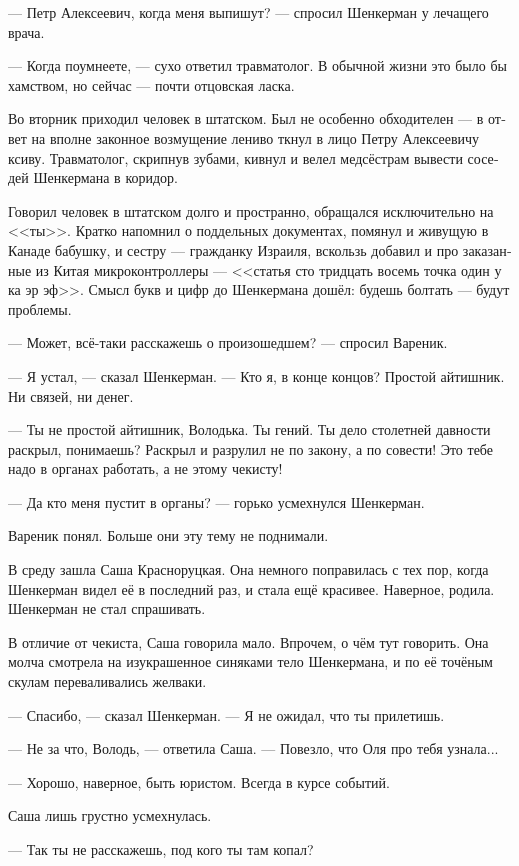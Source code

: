 \documentclass[a5paper,12pt,fleqn]{extbook}\usepackage{cooltooltips}\usepackage{polyglossia}\setdefaultlanguage[babelshorthands=true]{russian}\setotherlanguage{english}\defaultfontfeatures{Ligatures=TeX,Mapping=tex-text} \usepackage{xcolor}\definecolor{lightgray}{HTML}{bbbbbb}\color{lightgray}\newcommand{\ml}[3]{\textenglish{\textcolor{black}{#3}}}
\begin{document}
--- Петр Алексеевич, когда меня выпишут? --- спросил Шенкерман у лечащего врача.

--- Когда поумнеете, --- сухо ответил травматолог.
В обычной жизни это было бы хамством, но сейчас --- почти отцовская ласка.

Во вторник приходил человек в штатском.
Был не особенно обходителен --- в ответ на вполне законное возмущение лениво ткнул в лицо Петру Алексеевичу ксиву.
Травматолог, скрипнув зубами, кивнул и велел медсёстрам вывести соседей Шенкермана в коридор.

Говорил человек в штатском долго и пространно, обращался исключительно на <<ты>>.
Кратко напомнил о поддельных документах, помянул и живущую в Канаде бабушку, и сестру --- гражданку Израиля, вскользь добавил и про заказанные из Китая микроконтроллеры --- <<статья сто тридцать восемь точка один у ка эр эф>>.
Смысл букв и цифр до Шенкермана дошёл: будешь болтать --- будут проблемы.

--- Может, всё-таки расскажешь о произошедшем? --- спросил Вареник.

--- Я устал, --- сказал Шенкерман.
--- Кто я, в конце концов?
Простой айтишник.
Ни связей, ни денег.

--- Ты не простой айтишник, Володька.
Ты гений.
Ты дело столетней давности раскрыл, понимаешь?
Раскрыл и разрулил не по закону, а по совести!
Это тебе надо в органах работать, а не этому чекисту!

--- Да кто меня пустит в органы? --- горько усмехнулся Шенкерман.

Вареник понял.
Больше они эту тему не поднимали.

В среду зашла Саша Красноруцкая.
Она немного поправилась с тех пор, когда Шенкерман видел её в последний раз, и стала ещё красивее.
Наверное, родила.
Шенкерман не стал спрашивать.

В отличие от чекиста, Саша говорила мало.
Впрочем, о чём тут говорить.
Она молча смотрела на изукрашенное синяками тело Шенкермана, и по её точёным скулам переваливались желваки.

--- Спасибо, --- сказал Шенкерман.
--- Я не ожидал, что ты прилетишь.

--- Не за что, Володь, --- ответила Саша.
--- Повезло, что Оля про тебя узнала...

--- Хорошо, наверное, быть юристом.
Всегда в курсе событий.

Саша лишь грустно усмехнулась.

--- Так ты не расскажешь, под кого ты там копал?
\end{document}
